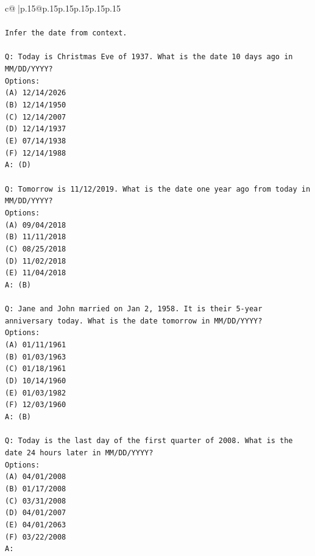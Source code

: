 \documentclass{article}
\begin{document}
{\begin{supertabular}{c@{$\;$}|p{.15\linewidth}@{}p{.15\linewidth}p{.15\linewidth}p{.15\linewidth}p{.15\linewidth}p{.15\linewidth}}
{{{\\ 
\\ 
\texttt{Infer the date from context.} \\
\\ 
\texttt{Q: Today is Christmas Eve of 1937. What is the date 10 days ago in MM/DD/YYYY?} \\
\texttt{Options:} \\
\texttt{(A) 12/14/2026} \\
\texttt{(B) 12/14/1950} \\
\texttt{(C) 12/14/2007} \\
\texttt{(D) 12/14/1937} \\
\texttt{(E) 07/14/1938} \\
\texttt{(F) 12/14/1988} \\
\texttt{A: (D)} \\
\\ 
\texttt{Q: Tomorrow is 11/12/2019. What is the date one year ago from today in MM/DD/YYYY?} \\
\texttt{Options:} \\
\texttt{(A) 09/04/2018} \\
\texttt{(B) 11/11/2018} \\
\texttt{(C) 08/25/2018} \\
\texttt{(D) 11/02/2018} \\
\texttt{(E) 11/04/2018} \\
\texttt{A: (B)} \\
\\ 
\texttt{Q: Jane and John married on Jan 2, 1958. It is their 5{-}year anniversary today. What is the date tomorrow in MM/DD/YYYY?} \\
\texttt{Options:} \\
\texttt{(A) 01/11/1961} \\
\texttt{(B) 01/03/1963} \\
\texttt{(C) 01/18/1961} \\
\texttt{(D) 10/14/1960} \\
\texttt{(E) 01/03/1982} \\
\texttt{(F) 12/03/1960} \\
\texttt{A: (B)} \\
\\ 
\texttt{Q: Today is the last day of the first quarter of 2008. What is the date 24 hours later in MM/DD/YYYY?} \\
\texttt{Options:} \\
\texttt{(A) 04/01/2008} \\
\texttt{(B) 01/17/2008} \\
\texttt{(C) 03/31/2008} \\
\texttt{(D) 04/01/2007} \\
\texttt{(E) 04/01/2063} \\
\texttt{(F) 03/22/2008} \\
\texttt{A:} \\
            }
        }
    }
     \\ \\


\end{supertabular}}
\end{document}
